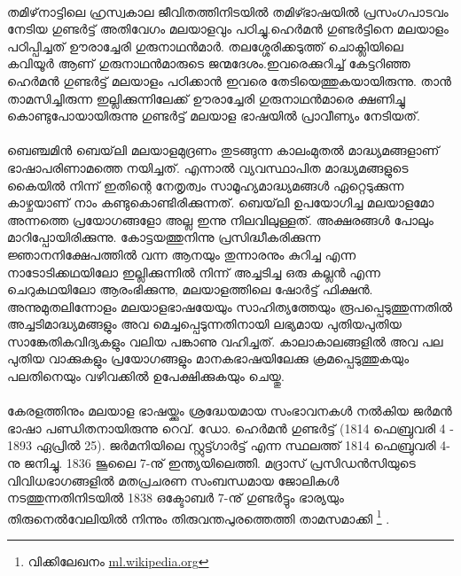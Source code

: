 \paragraph{}
തമിഴ്‌നാട്ടിലെ ഹ്രസ്വകാല ജീവിതത്തിനിടയിൽ തമിഴ്ഭാഷയിൽ പ്രസംഗപാടവം നേടിയ ഗുണ്ടർട്ട് അതിവേഗം മലയാളവും പഠിച്ചു.ഹെർമൻ ഗുണ്ടർട്ടിനെ മലയാളം പഠിപ്പിച്ചത് ഊരാച്ചേരി ഗുരുനാഥൻമാർ. തലശ്ശേരിക്കടുത്ത് ചൊക്ലിയിലെ കവിയൂർ ആണ് ഗുരുനാഥൻമാരുടെ ജന്മദേശം.ഇവരെക്കുറിച്ച് കേട്ടറിഞ്ഞ ഹെർമൻ ഗുണ്ടർട്ട് മലയാളം പഠിക്കാൻ ഇവരെ തേടിയെത്തുകയായിരുന്നു. താൻ താമസിച്ചിരുന്ന ഇല്ലിക്കുന്നിലേക്ക് ഊരാച്ചേരി ഗുരുനാഥൻമാരെ ക്ഷണിച്ചു കൊണ്ടുപോയായിരുന്നു ഗുണ്ടർട്ട് മലയാള ഭാഷയിൽ പ്രാവീണ്യം നേടിയത്. 

\paragraph{}
ബെഞ്ചമിൻ ബെയ്‌ലി മലയാളമുദ്രണം തുടങ്ങുന്ന കാലംമുതൽ മാദ്ധ്യമങ്ങളാണ് ഭാഷാപരിണാമത്തെ നയിച്ചത്. എന്നാൽ വ്യവസ്ഥാപിത മാദ്ധ്യമങ്ങളുടെ കൈയിൽ നിന്ന് ഇതിന്റെ നേതൃത്വം സാമൂഹ്യമാദ്ധ്യമങ്ങൾ ഏറ്റെടുക്കുന്ന കാഴ്ചയാണ് നാം കണ്ടുകൊണ്ടിരിക്കുന്നത്. ബെയ്‌ലി ഉപയോഗിച്ച മലയാളമോ അന്നത്തെ പ്രയോഗങ്ങളോ അല്ല ഇന്നു നിലവിലുള്ളത്. അക്ഷരങ്ങൾ പോലും മാറിപ്പോയിരിക്കുന്നു. കോട്ടയത്തുനിന്നു പ്രസിദ്ധീകരിക്കുന്ന ജ്ഞാനനിക്ഷേപത്തിൽ വന്ന ആനയും തുന്നാരനും കുറിച്ച എന്ന നാടോടിക്കഥയിലോ ഇല്ലിക്കുന്നിൽ നിന്ന് അച്ചടിച്ച ഒരു കല്ലൻ എന്ന ചെറുകഥയിലോ ആരംഭിക്കുന്നു, മലയാളത്തിലെ ഷോർട്ട് ഫിക്ഷൻ. അന്നുമുതലിന്നോളം മലയാളഭാഷയേയും സാഹിത്യത്തേയും രൂപപ്പെടുത്തുന്നതിൽ അച്ചടിമാദ്ധ്യമങ്ങളും അവ മെച്ചപ്പെടുന്നതിനായി ലഭ്യമായ പുതിയപുതിയ സാങ്കേതികവിദ്യകളും വലിയ പങ്കാണു വഹിച്ചത്. കാലാകാലങ്ങളിൽ അവ പല പുതിയ വാക്കുകളും പ്രയോഗങ്ങളും മാനകഭാഷയിലേക്കു ക്രമപ്പെടുത്തുകയും പലതിനെയും വഴിവക്കിൽ ഉപേക്ഷിക്കുകയും ചെയ്തു\cite{bailey}. 


\paragraph{}
 കേരളത്തിനും മലയാള ഭാഷയ്ക്കും ശ്രദ്ധേയമായ സംഭാവനകൾ നൽകിയ ജർമൻ ഭാഷാ പണ്ഡിതനായിരുന്നു റെവ്. ഡോ. ഹെർമൻ ഗുണ്ടർട്ട് (1814 ഫെബ്രുവരി 4 - 1893 ഏപ്രിൽ 25). ജർമനിയിലെ സ്റ്റുട്ട്ഗാർട്ട് എന്ന സ്ഥലത്ത് 1814 ഫെബ്രുവരി 4-നു ജനിച്ചു. 1836 ജൂലൈ 7-നു് ഇന്ത്യയിലെത്തി. മദ്രാസ് പ്രസിഡൻസിയുടെ വിവിധഭാഗങ്ങളിൽ മതപ്രചരണ സംബന്ധമായ ജോലികൾ നടത്തുന്നതിനിടയിൽ 1838 ഒക്ടോബർ 7-നു് ഗുണ്ടർട്ടും ഭാര്യയും തിരുനെൽവേലിയിൽ നിന്നും തിരുവന്തപുരത്തെത്തി താമസമാക്കി  \footnote{വിക്കിലേഖനം \url{ml.wikipedia.org}} .